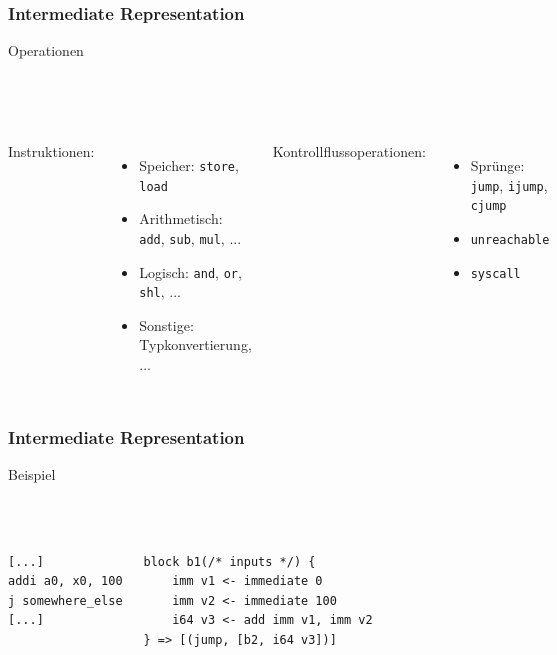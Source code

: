 \begin{frame}
    \frametitle{Intermediate Representation}{Operationen}

    ~\\
    ~\\

    \begin{columns}[t]
        Instruktionen:
        \begin{itemize}
            \item Speicher: \texttt{store}, \texttt{load}
            \item Arithmetisch: \texttt{add}, \texttt{sub}, \texttt{mul}, ...
            \item Logisch: \texttt{and}, \texttt{or}, \texttt{shl}, ...
            \item Sonstige: Typkonvertierung, ...
        \end{itemize}

        Kontrollflussoperationen:
        \begin{itemize}
            \item Sprünge: \texttt{jump}, \texttt{ijump}, \texttt{cjump}
            \item \texttt{unreachable}
            \item \texttt{syscall}
        \end{itemize}
    \end{columns}
\end{frame}


\begin{frame}[fragile]
    \frametitle{Intermediate Representation}{Beispiel}
    \pause{}
    ~\\
    ~\\
    ~\\
    \begin{columns}[c]
        \begin{lstlisting}[language=rv64]
[...]
addi a0, x0, 100
j somewhere_else
[...]
        \end{lstlisting}



        \begin{lstlisting}[language=SbtIr]
block b1(/* inputs */) {
    imm v1 <- immediate 0
    imm v2 <- immediate 100
    i64 v3 <- add imm v1, imm v2
} => [(jump, [b2, i64 v3])]
    \end{lstlisting}
    \end{columns}

\end{frame}
\clearpage

